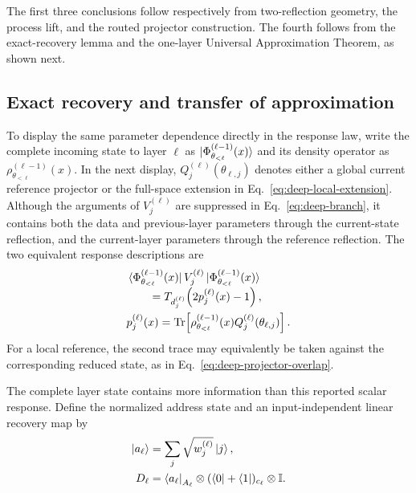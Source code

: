 \documentclass[pdflatex,sn-mathphys,NameDate,iicol]{sn-jnl}
\newcommand{\Tr}{\operatorname{Tr}}
\newcommand{\id}{\mathbb{I}}
\begin{document}
The first three conclusions follow respectively from two-reflection geometry,
the process lift, and the routed projector construction. The fourth follows
from the exact-recovery lemma and the one-layer Universal Approximation
Theorem, as shown next.

\subsection{Exact recovery and transfer of approximation}
\label{sec:deep-transfer}

To display the same parameter dependence directly in the response law, write
the complete incoming state to layer $\ell$ as
$\ket{\Phi_{\theta_{<\ell}}^{(\ell-1)}(x)}$ and its density operator as
$\rho_{\theta_{<\ell}}^{(\ell-1)}(x)$. In the next display,
$Q_j^{(\ell)}(\theta_{\ell,j})$ denotes either a global current reference
projector or the full-space extension in
Eq.~\eqref{eq:deep-local-extension}. Although the arguments of
$V_j^{(\ell)}$ are suppressed in Eq.~\eqref{eq:deep-branch}, it contains both
the data and previous-layer parameters through the current-state reflection,
and the current-layer parameters through the reference reflection. The two
equivalent response descriptions are
\begin{align}
&\bra{\Phi_{\theta_{<\ell}}^{(\ell-1)}(x)}
 V_j^{(\ell)}
 \ket{\Phi_{\theta_{<\ell}}^{(\ell-1)}(x)}\nonumber\\[-1mm]
&\qquad
 =T_{d_j^{(\ell)}}\!\left(2p_j^{(\ell)}(x)-1\right),
 \label{eq:deep-expectation-chebyshev}\\
&p_j^{(\ell)}(x)
 =\Tr\!\left[
 \rho_{\theta_{<\ell}}^{(\ell-1)}(x)
 Q_j^{(\ell)}(\theta_{\ell,j})
 \right].
 \label{eq:deep-parameterized-overlap}
\end{align}
For a local reference, the second trace may equivalently be taken against the
corresponding reduced state, as in Eq.~\eqref{eq:deep-projector-overlap}.

The complete layer state contains more information than this reported scalar
response. Define the normalized address state and an input-independent linear
recovery map by
\begin{equation}
 \begin{aligned}
 \ket{a_\ell}
 &=\sum_j\sqrt{w_j^{(\ell)}}\ket j,\\
 D_\ell
 &=\bra{a_\ell}_{A_\ell}\otimes
  (\bra0+\bra1)_{c_\ell}\otimes\id.
 \end{aligned}
 \label{eq:deep-recovery-map}
\end{equation}
\end{document}
